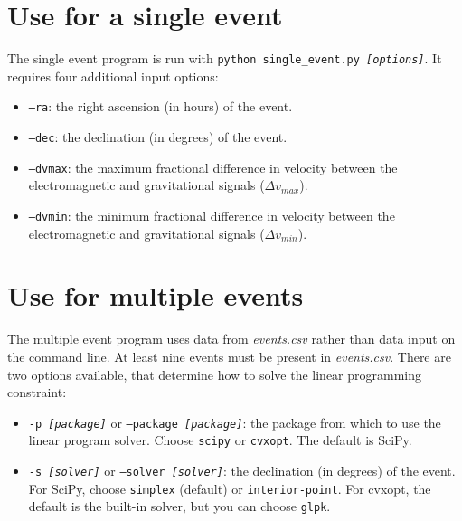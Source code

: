 \documentclass[11pt,notitlepage]{article}
\begin{document}
\section{Use for a single event}
The single event program is run with \texttt{python single\_event.py \textit{[options]}}. It requires four additional input options:
\begin{itemize}
    \item \texttt{--ra}: the right ascension (in hours) of the event.
    \item \texttt{--dec}: the declination (in degrees) of the event.
    \item \texttt{--dvmax}: the maximum fractional difference in velocity between the electromagnetic and gravitational signals ($\Delta v_{max}$).
    \item \texttt{--dvmin}: the minimum fractional difference in velocity between the electromagnetic and gravitational signals ($\Delta v_{min}$).
\end{itemize}

\section{Use for multiple events}
The multiple event program uses data from \textit{events.csv} rather than data input on the command line. At least nine events must be present in \textit{events.csv}. There are two options available, that determine how to solve the linear programming constraint:
\begin{itemize}
    \item \texttt{-p \textit{[package]}} or \texttt{--package \textit{[package]}}: the package from which to use the linear program solver. Choose \texttt{scipy} or \texttt{cvxopt}. The default is SciPy.
    \item \texttt{-s \textit{[solver]}} or \texttt{--solver \textit{[solver]}}: the declination (in degrees) of the event. For SciPy, choose \texttt{simplex} (default) or \texttt{interior-point}. For cvxopt, the default is the built-in solver, but you can choose \texttt{glpk}.
\end{itemize}
\end{document}
